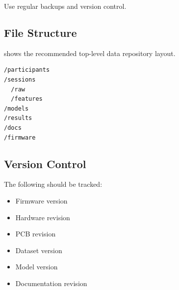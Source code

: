 \begin{engnote}
Use regular backups and version control.
\end{engnote}

\subsection{File Structure}
\label{sec:data-file-structure}

 shows the recommended top-level data repository layout.

\begin{lstlisting}[caption={Recommended PSYCON data repository structure.}, label={lst:data-file-structure}]
/participants
/sessions
  /raw
  /features
/models
/results
/docs
/firmware
\end{lstlisting}

\subsection{Version Control}
\label{sec:data-version-control}

The following should be tracked:
\begin{itemize}
    \item Firmware version
    \item Hardware revision
    \item PCB revision
    \item Dataset version
    \item Model version
    \item Documentation revision
\end{itemize}
